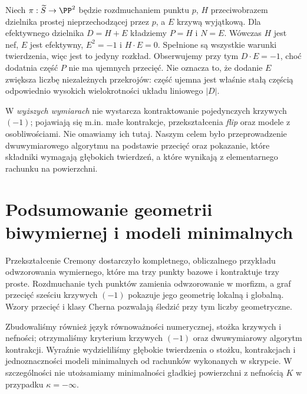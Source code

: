 \begin{przyklad}
Niech $\pi:\widetilde S\to\PP^2$ będzie rozdmuchaniem
punktu $p$, $H$ przeciwobrazem dzielnika prostej
nieprzechodzącej przez $p$, a $E$ krzywą wyjątkową. Dla efektywnego dzielnika
$D=H+E$ kładziemy $P=H$ i $N=E$.
Wówczas $H$ jest nef, $E$ jest efektywny,
$E^2=-1$ i $H\cdot E=0$. Spełnione są wszystkie
warunki twierdzenia, więc jest to jedyny rozkład.
Obserwujemy przy tym $D\cdot E=-1$,
choć dodatnia część $P$ nie ma ujemnych przecięć.
Nie oznacza to, że dodanie $E$ zwiększa liczbę
niezależnych przekrojów: część ujemna jest
właśnie stałą częścią odpowiednio wysokich
wielokrotności układu liniowego $|D|$.
\end{przyklad}

W \emph{wyższych wymiarach} nie wystarcza
kontraktowanie pojedynczych krzywych $(-1)$;
pojawiają się m.in. małe kontrakcje, przekształcenia
\emph{flip} oraz modele z osobliwościami.
Nie omawiamy ich tutaj. Naszym celem było
przeprowadzenie dwuwymiarowego algorytmu na
podstawie przecięć oraz pokazanie, które składniki
wymagają głębokich twierdzeń, a które wynikają
z elementarnego rachunku na powierzchni.



\section{Podsumowanie geometrii biwymiernej i modeli minimalnych}
\label{sec:ga8-conclusion}

Przekształcenie Cremony dostarczyło kompletnego,
obliczalnego przykładu odwzorowania wymiernego,
które ma trzy punkty bazowe i kontraktuje trzy proste.
Rozdmuchanie tych punktów zamienia odwzorowanie
w morfizm, a graf przecięć sześciu krzywych
$(-1)$ pokazuje jego geometrię lokalną i globalną.
Wzory przecięć i klasy Cherna pozwalają śledzić
przy tym liczby geometryczne.

Zbudowaliśmy również język równoważności numerycznej,
stożka krzywych i nefności; otrzymaliśmy kryterium
krzywych $(-1)$ oraz dwuwymiarowy algorytm kontrakcji.
Wyraźnie wydzieliliśmy głębokie twierdzenia o stożku,
kontrakcjach i jednoznaczności modeli minimalnych od
rachunków wykonanych w skrypcie. W szczególności
nie utożsamiamy minimalności gładkiej powierzchni
z nefnością $K$ w przypadku $\kappa=-\infty$.


